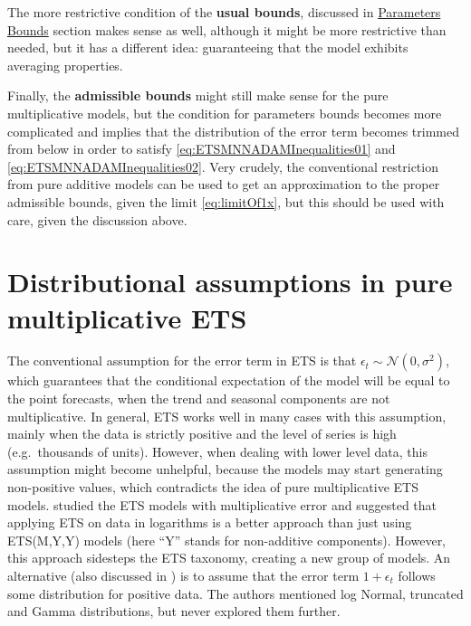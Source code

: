 \documentclass[
]{book}
\theoremstyle{definition}
\theoremstyle{definition}
\theoremstyle{definition}
\theoremstyle{definition}
\theoremstyle{remark}
\begin{document}
The more restrictive condition of the \textbf{usual bounds}, discussed in \protect\hyperlink{ETSParametersBounds}{Parameters Bounds} section makes sense as well, although it might be more restrictive than needed, but it has a different idea: guaranteeing that the model exhibits averaging properties.

Finally, the \textbf{admissible bounds} might still make sense for the pure multiplicative models, but the condition for parameters bounds becomes more complicated and implies that the distribution of the error term becomes trimmed from below in order to satisfy \eqref{eq:ETSMNNADAMInequalities01} and \eqref{eq:ETSMNNADAMInequalities02}. Very crudely, the conventional restriction from pure additive models can be used to get an approximation to the proper admissible bounds, given the limit \eqref{eq:limitOf1x}, but this should be used with care, given the discussion above.

\hypertarget{ADAMETSMultiplicativeDistributions}{%
\section{Distributional assumptions in pure multiplicative ETS}\label{ADAMETSMultiplicativeDistributions}}

The conventional assumption for the error term in ETS is that \(\epsilon_t\sim\mathcal{N}(0,\sigma^2)\), which guarantees that the conditional expectation of the model will be equal to the point forecasts, when the trend and seasonal components are not multiplicative. In general, ETS works well in many cases with this assumption, mainly when the data is strictly positive and the level of series is high (e.g.~thousands of units). However, when dealing with lower level data, this assumption might become unhelpful, because the models may start generating non-positive values, which contradicts the idea of pure multiplicative ETS models. \citet{Akram2009} studied the ETS models with multiplicative error and suggested that applying ETS on data in logarithms is a better approach than just using ETS(M,Y,Y) models (here ``Y'' stands for non-additive components). However, this approach sidesteps the ETS taxonomy, creating a new group of models. An alternative (also discussed in \citet{Akram2009}) is to assume that the error term \(1+\epsilon_t\) follows some distribution for positive data. The authors mentioned log Normal, truncated and Gamma distributions, but never explored them further.
\end{document}
